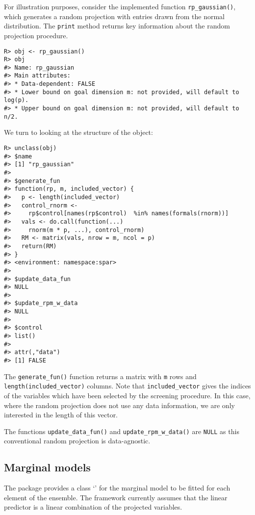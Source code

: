 \documentclass[
  article]{jss}
\newcommand{\class}[1]{`\code{#1}'}
\begin{document}
For illustration purposes, consider the implemented function
\texttt{rp\_gaussian()}, which generates a random projection with
entries drawn from the normal distribution. The \texttt{print} method
returns key information about the random projection procedure.

\begin{verbatim}
R> obj <- rp_gaussian()
R> obj
#> Name: rp_gaussian 
#> Main attributes: 
#> * Data-dependent: FALSE 
#> * Lower bound on goal dimension m: not provided, will default to log(p). 
#> * Upper bound on goal dimension m: not provided, will default to n/2.
\end{verbatim}

We turn to looking at the structure of the object:

\begin{verbatim}
R> unclass(obj)
#> $name
#> [1] "rp_gaussian"
#> 
#> $generate_fun
#> function(rp, m, included_vector) {
#>   p <- length(included_vector)
#>   control_rnorm <-
#>     rp$control[names(rp$control)  %in% names(formals(rnorm))]
#>   vals <- do.call(function(...)
#>     rnorm(m * p, ...), control_rnorm)
#>   RM <- matrix(vals, nrow = m, ncol = p)
#>   return(RM)
#> }
#> <environment: namespace:spar>
#> 
#> $update_data_fun
#> NULL
#> 
#> $update_rpm_w_data
#> NULL
#> 
#> $control
#> list()
#> 
#> attr(,"data")
#> [1] FALSE
\end{verbatim}

The \texttt{generate\_fun()} function returns a matrix with \texttt{m}
rows and \texttt{length(included\_vector)} columns. Note that
\texttt{included\_vector} gives the indices of the variables which have
been selected by the screening procedure. In this case, where the random
projection does not use any data information, we are only interested in
the length of this vector.

The functions \texttt{update\_data\_fun()} and
\texttt{update\_rpm\_w\_data()} are \texttt{NULL} as this conventional
random projection is data-agnostic.

\subsection{Marginal models}\label{marginal-models}

The package provides a class \class{sparmodel} for the marginal model to
be fitted for each element of the ensemble. The framework currently
assumes that the linear predictor is a linear combination of the
projected variables.
\end{document}
